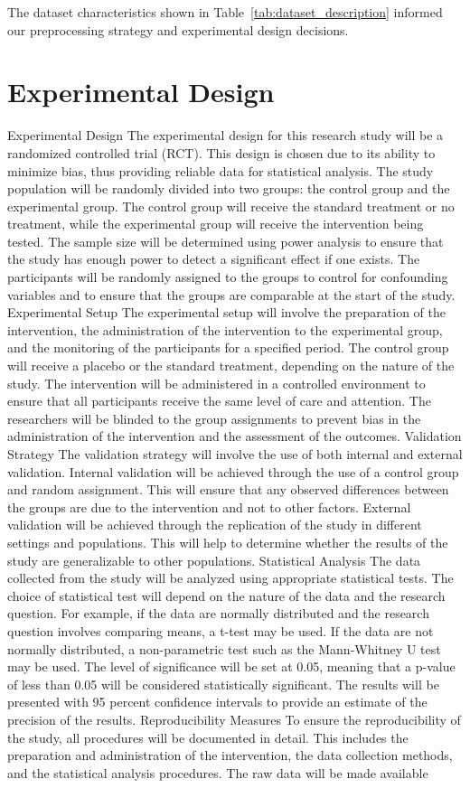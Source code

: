 \documentclass[conference]{IEEEtran}
\begin{document}
The dataset characteristics shown in Table~\ref{tab:dataset_description} informed our preprocessing strategy and experimental design decisions.

\section{Experimental Design}
Experimental Design The experimental design for this research study will be a randomized controlled trial (RCT). This design is chosen due to its ability to minimize bias, thus providing reliable data for statistical analysis. The study population will be randomly divided into two groups: the control group and the experimental group. The control group will receive the standard treatment or no treatment, while the experimental group will receive the intervention being tested. The sample size will be determined using power analysis to ensure that the study has enough power to detect a significant effect if one exists. The participants will be randomly assigned to the groups to control for confounding variables and to ensure that the groups are comparable at the start of the study. Experimental Setup The experimental setup will involve the preparation of the intervention, the administration of the intervention to the experimental group, and the monitoring of the participants for a specified period. The control group will receive a placebo or the standard treatment, depending on the nature of the study. The intervention will be administered in a controlled environment to ensure that all participants receive the same level of care and attention. The researchers will be blinded to the group assignments to prevent bias in the administration of the intervention and the assessment of the outcomes. Validation Strategy The validation strategy will involve the use of both internal and external validation. Internal validation will be achieved through the use of a control group and random assignment. This will ensure that any observed differences between the groups are due to the intervention and not to other factors. External validation will be achieved through the replication of the study in different settings and populations. This will help to determine whether the results of the study are generalizable to other populations. Statistical Analysis The data collected from the study will be analyzed using appropriate statistical tests. The choice of statistical test will depend on the nature of the data and the research question. For example, if the data are normally distributed and the research question involves comparing means, a t-test may be used. If the data are not normally distributed, a non-parametric test such as the Mann-Whitney U test may be used. The level of significance will be set at 0.05, meaning that a p-value of less than 0.05 will be considered statistically significant. The results will be presented with 95 percent confidence intervals to provide an estimate of the precision of the results. Reproducibility Measures To ensure the reproducibility of the study, all procedures will be documented in detail. This includes the preparation and administration of the intervention, the data collection methods, and the statistical analysis procedures. The raw data will be made available 
\end{document}
